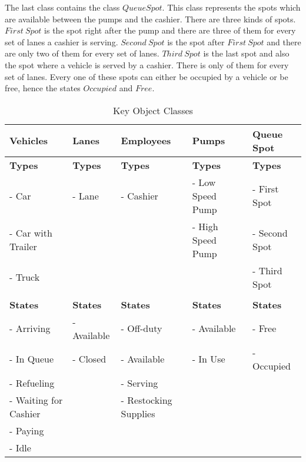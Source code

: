 \indent The last class contains the class $Queue Spot$. This class represents the spots which are available between the pumps and the cashier. There are three kinds of spots. $First \ Spot$ is the spot right after the pump and there are three of them for every set of lanes a cashier is serving. $Second \ Spot$ is the spot after $First \ Spot$ and there are only two of them for every set of lanes. $Third \ Spot$ is the last spot and also the spot where a vehicle is served by a cashier. There is only of them for every set of lanes. Every one of these spots can either be occupied by a vehicle or be free, hence the states $Occupied$ and $Free$.

\begin{center}
\begin{table}[h]
\begin{tabular}{| l | l | l | l | l |}
\hline
\textbf{Vehicles} & \textbf{Lanes} & \textbf{Employees} & \textbf{Pumps} & \textbf{Queue Spot}\\
\hline
\textbf{Types} & \textbf{Types} & \textbf{Types} & \textbf{Types} & \textbf{Types}\\
- Car & - Lane & - Cashier& - Low Speed Pump & - First Spot\\
- Car with Trailer & & & - High Speed Pump & - Second Spot\\
- Truck & & & & - Third Spot\\
& & & & \\
\textbf{States} & \textbf{States} & \textbf{States} & \textbf{States} & \textbf{States}\\
- Arriving & - Available & - Off-duty & - Available & - Free\\
- In Queue & - Closed & - Available & - In Use & - Occupied\\
- Refueling & & - Serving & &\\
- Waiting for Cashier & & - Restocking Supplies & &\\
- Paying & & & &\\
- Idle & & & &\\
\hline
\end{tabular}
\caption{Key Object Classes}
\label{tab:koc}
\end{table}
\end{center}

